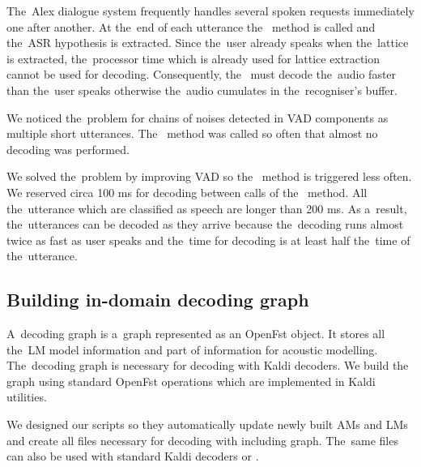 The~Alex dialogue system frequently handles several spoken requests immediately one after another.
At the~end of each utterance the~ method is called and the~ASR hypothesis is extracted.
Since the~user already speaks when the~lattice is extracted, the~processor time which is already used for lattice extraction cannot be used for decoding.
Consequently, the~ must decode the~audio faster than the~user speaks otherwise the~audio cumulates in the~recogniser's buffer.

We noticed the~problem for chains of noises detected in \ac{VAD} components as multiple short utterances.
The~ method was called so often that almost no decoding was performed.

We solved the~problem by improving \ac{VAD} so the~ method is triggered less often.
We reserved circa 100 ms for decoding between calls of the~ method.
All the~utterance which are classified as speech are longer than 200 ms.
As a~result, the~utterances can be decoded as they arrive because the~decoding runs almost twice as fast as user speaks and the~time for decoding is at least half the~time of the~utterance.

\subsection{Building in-domain decoding graph}
\label{sub:hclg}
A~decoding graph is a~graph represented as an OpenFst object. It stores all the~\ac{LM} model information and part of information for acoustic modelling. 
The~decoding graph is necessary for decoding with Kaldi decoders.
We build the~ graph using standard OpenFst operations which are implemented in Kaldi utilities. 

We designed our scripts so they automatically update newly built \acp{AM} and \acp{LM} and create all files necessary for decoding with  including  graph.
The~same files can also be used with standard Kaldi decoders or .

